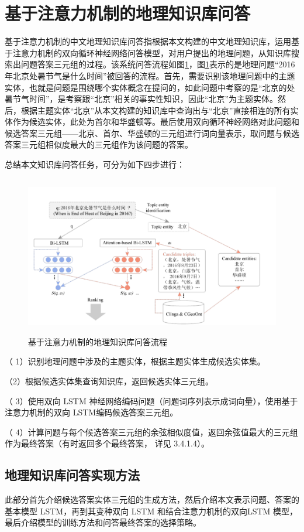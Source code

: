 \section{基于注意力机制的地理知识库问答}
基于注意力机制的中文地理知识库问答指根据本文构建的中文地理知识库，运用基于注意力机制的双向循环神经网络问答模型，对用户提出的地理问题，从知识库搜索出问题答案三元组的过程。该系统问答流程如图\ref{fig:qa_overview}，图\ref{fig:qa_overview}表示的是地理问题“2016年北京处暑节气是什么时间”被回答的流程。首先，需要识别该地理问题中的主题实体，也就是问题是围绕哪个实体概念在提问的，如此问题中考察的是“北京的处暑节气时间”，是考察跟“北京”相关的事实性知识，因此“北京”为主题实体。然后，根据主题实体“北京”从本文构建的知识库中查询出与“北京”直接相连的所有实体作为候选实体，此处为首尔和华盛顿等。最后使用双向循环神经网络对此问题和候选答案三元组——北京、首尔、华盛顿的三元组进行词向量表示，取问题与候选答案三元组相似度最大的三元组作为该问题的答案。

总结本文知识库问答任务，可分为如下四步进行：

\begin{figure}[!htb]
	\centering\includegraphics[height=7cm]{resource/qa_overview_1}
	\caption{基于注意力机制的地理知识库问答流程}
	\label{fig:qa_overview}
\end{figure}

（ 1）识别地理问题中涉及的主题实体，根据主题实体生成候选实体集。

（2）根据候选实体集查询知识库，返回候选实体三元组。

（ 3）使用双向 LSTM 神经网络编码问题（问题词序列表示成词向量），使用基于注意力机制的双向 LSTM编码候选答案三元组。

（ 4）计算问题与每个候选答案三元组的余弦相似度值，返回余弦值最大的三元组作为最终答案（有时返回多个最终答案， 详见 3.4.1.4）。

\subsection{地理知识库问答实现方法}
此部分首先介绍候选答案实体三元组的生成方法，然后介绍本文表示问题、答案的基本模型 LSTM，再到其变种双向 LSTM 和结合注意力机制的双向LSTM 模型，最后介绍模型的训练方法和问答最终答案的选择策略。

